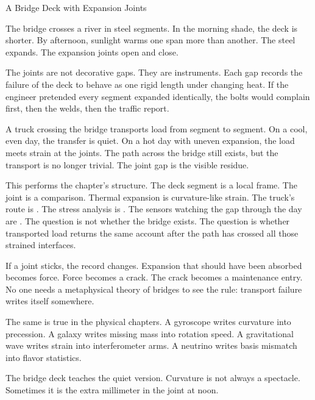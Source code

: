 \begin{coda}{A Bridge Deck with Expansion Joints}

The bridge crosses a river in steel segments. In the morning shade, the deck is
shorter. By afternoon, sunlight warms one span more than another. The steel
expands. The expansion joints open and close.

The joints are not decorative gaps. They are instruments. Each gap records the
failure of the deck to behave as one rigid length under changing heat. If the
engineer pretended every segment expanded identically, the bolts would complain
first, then the welds, then the traffic report.

A truck crossing the bridge transports load from segment to segment. On a cool,
even day, the transfer is quiet. On a hot day with uneven expansion, the load
meets strain at the joints. The path across the bridge still exists, but the
transport is no longer trivial. The joint gap is the visible residue.

This performs the chapter's structure. The deck segment is a local frame. The
joint is a comparison. Thermal expansion is curvature-like strain. The truck's
route is . The stress analysis is . The
sensors watching the gap through the day are . The
question is not whether the bridge exists. The question is whether transported
load returns the same account after the path has crossed all those strained
interfaces.

If a joint sticks, the record changes. Expansion that should have been absorbed
becomes force. Force becomes a crack. The crack becomes a maintenance entry.
No one needs a metaphysical theory of bridges to see the rule: transport
failure writes itself somewhere.

The same is true in the physical chapters. A gyroscope writes curvature into
precession. A galaxy writes missing mass into rotation speed. A gravitational
wave writes strain into interferometer arms. A neutrino writes basis mismatch
into flavor statistics.

The bridge deck teaches the quiet version. Curvature is not always a spectacle.
Sometimes it is the extra millimeter in the joint at noon.

\end{coda}
